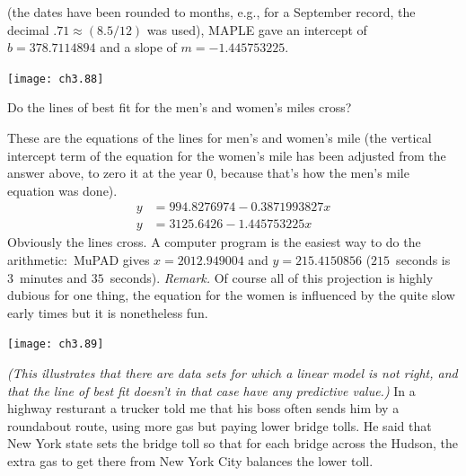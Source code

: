 \begin{exercises}
\begin{answer}
     (the dates have been rounded to months, e.g., for a September record,
     the decimal $.71\approx (8.5/12)$ was used),
     MAPLE gave an intercept of $b=378.7114894$ and a slope of 
    $m=-1.445753225$.
    \begin{center}  \small
      \texttt{[image: ch3.88]}
    \end{center}
   \end{answer}   
  \item 
  Do the lines of best fit for the men's and women's miles cross?
  \begin{answer}
    These are the equations of the lines for men's and women's mile 
    (the vertical intercept term of the equation
    for the women's mile has been adjusted from the answer above,
    to zero it at the year $0$,
    because that's how the men's mile equation was done).
    \begin{align*}
        y &=994.8276974-0.3871993827x  \\
        y &=3125.6426-1.445753225x
    \end{align*}
    Obviously the lines cross.
    A computer program  is the easiest way to do the
    arithmetic:~MuPAD gives $x=2012.949004$ and $y=215.4150856$
    ($215$~seconds is $3$~minutes and $35$~seconds).
    \textit{Remark.}
    Of course all of this projection is highly dubious \Dash  for one thing,
    the equation for the women is influenced by the quite slow early 
    times \Dash  but it is nonetheless fun.
     \begin{center}  \small
       \texttt{[image: ch3.89]}
     \end{center}
  \end{answer}
  \item
    \textit{(This illustrates that there are data sets for which a 
    linear model is not right,  and that the line of best fit doesn't
    in that case have any predictive value.)} 
    In a highway resturant a trucker told me that his boss often sends 
    him by a roundabout route, using more gas
    but paying lower bridge tolls.
    He said that New York state sets the bridge 
    toll so that for each bridge across the Hudson, 
    the extra gas to get there
    from New York City balances the lower toll.

\end{exercises}
